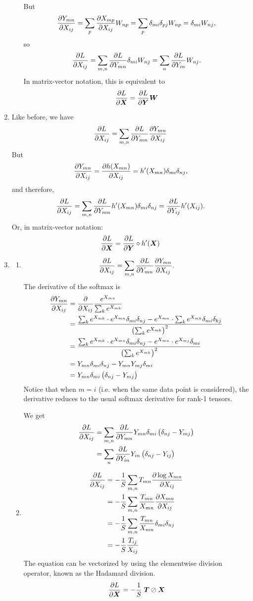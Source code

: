 \documentclass{article}
\begin{document}
\begin{enumerate}[label=(\alph*)]
\begin{enumerate}[label=(\roman*)]
$$	$$ But
	$$
	\frac{\partial Y_{mn}}{\partial X_{ij}} = \sum_p\frac{\partial X_{mp}}{\partial X_{ij}}W_{np} = \sum_p\delta_{mi}\delta_{pj}W_{np} = \delta_{mi}W_{nj},
	$$
	so
	$$
	\frac{\partial L}{\partial X_{ij}} = \sum_{m, n}\frac{\partial L}{\partial Y_{mn}}\delta_{mi}W_{nj} = \sum_n \frac{\partial L}{\partial Y_{in}}W_{nj}.
	$$ In matrix-vector notation, this is equivalent to
	$$
	\frac{\partial L}{\partial \boldsymbol{X}} = \frac{\partial L}{\partial \boldsymbol{Y}}\boldsymbol{W}
	$$
\end{enumerate}
	\item Like before, we have
	$$
	\frac{\partial L}{\partial X_{ij}} = \sum_{m, n}\frac{\partial L}{\partial Y_{mn}}\frac{\partial Y_{mn}}{\partial X_{ij}}
	$$ But
	$$
	\frac{\partial Y_{mn}}{\partial X_{ij}} = \frac{\partial h(X_{mn})}{\partial X_{ij}} = h'(X_{mn})\delta_{mi}\delta_{nj},
	$$ and therefore,
	$$
	\frac{\partial L}{\partial X_{ij}} = \sum_{m, n}\frac{\partial L}{\partial Y_{mn}}h'(X_{mn})\delta_{mi}\delta_{nj} = \frac{\partial L}{\partial Y_{ij}}h'(X_{ij}).
	$$ Or, in matrix-vector notation:
	$$\frac{\partial L}{\partial \boldsymbol{X}} = \frac{\partial L}{\partial \boldsymbol{Y}} \circ h'(\boldsymbol{X})$$
	\item
	\begin{enumerate}[label=(\roman*)]
		\item
		$$
		 \frac{\partial L}{\partial X_{ij}} = \sum_{m, n}\frac{\partial L}{\partial Y_{mn}}\frac{\partial Y_{mn}}{\partial X_{ij}}.
		$$ The derivative of the softmax is
		$$
		\begin{aligned}
		\frac{\partial Y_{mn}}{\partial X_{ij}} &= \frac{\partial }{\partial X_{ij}} \frac{e^{X_{mn}}}{\sum_ke^{X_{mk}}} \\ &= \frac{\sum_ke^{X_{mk}} \cdot e^{X_{mn}}\delta_{mi}\delta_{nj} - e^{X_{mn}}\cdot\sum_ke^{X_{mk}}\delta_{mi}\delta_{kj}}{\left(\sum_ke^{X_{mk}}\right)^2} \\ &= \frac{\sum_ke^{X_{mk}} \cdot e^{X_{mn}}\delta_{mi}\delta_{nj} - e^{X_{mn}}\cdot e^{X_{mj}}\delta_{mi}}{\left(\sum_ke^{X_{mk}}\right)^2}\\
		&= Y_{mn}\delta_{mi}\delta_{nj} - Y_{mn}Y_{mj}\delta_{mi} \\ &= Y_{mn}\delta_{mi}\left(\delta_{nj} - Y_{mj}\right)
		\end{aligned}
		$$ Notice that when $m = i$ (i.e. when the same data point is considered), the derivative reduces to the usual softmax derivative for rank-1 tensors.
		
		We get
		$$
		\begin{aligned}
		\frac{\partial L}{\partial X_{ij}} &= \sum_{m, n}\frac{\partial L}{\partial Y_{mn}}Y_{mn}\delta_{mi}\left(\delta_{nj} - Y_{mj}\right) \\ &= \sum_n\frac{\partial L}{\partial Y_{in}}Y_{in}\left(\delta_{nj} - Y_{ij}\right)
		\end{aligned}
		$$
		\item 
		$$
		\begin{aligned}
		\frac{\partial L}{\partial X_{ij}} &= -\frac{1}{S}\sum_{m, n}T_{mn}\frac{\partial \log X_{mn}}{\partial X_{ij} }\\ &= -\frac{1}{S}\sum_{m, n}\frac{T_{mn}}{X_{mn}}\frac{\partial X_{mn}}{\partial X_{ij}} \\ &= -\frac{1}{S}\sum_{m, n}\frac{T_{mn}}{X_{mn}}\delta_{mi}\delta_{nj} \\ &= -\frac{1}{S}\frac{T_{ij}}{X_{ij}}
		\end{aligned}
		$$ The equation can be vectorized by using the elementwise division operator, known as the Hadamard division.
		$$
		\frac{\partial L}{\partial \boldsymbol{X}} = -\frac{1}{S} \; \boldsymbol{T} \oslash \boldsymbol{X}
		$$
	\end{enumerate}
\end{enumerate}
\end{document}

